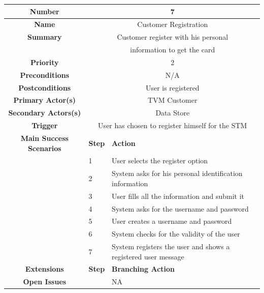 \documentclass[a4paper,12pt]{report}
\begin{document}
\begin{tabular}{ | c | p{2cm} | p{7cm} |}
	
	\hline
	\textbf{Number} & \multicolumn{2}{c|}{7}  \\
	\hline
	\textbf{Name} & \multicolumn{2}{c|}{Customer Registration}  \\
	\hline
	\textbf{Summary} & \multicolumn{2}{c|}{Customer register with his personal}\\
					  & \multicolumn{2}{c|}{information to get the card}  \\
	\hline
	\textbf{Priority} & \multicolumn{2}{c|}{2}  \\
	\hline
	\textbf{Preconditions} & \multicolumn{2}{c|}{N/A}  \\
	\hline
	\textbf{Postconditions} & \multicolumn{2}{c|}{User is registered}  \\
	\hline
	\textbf{Primary Actor(s)} & \multicolumn{2}{c|}{TVM Customer}  \\
	\hline
	\textbf{Secondary Actors(s)} & \multicolumn{2}{c|}{Data Store}  \\
	\hline
	\textbf{Trigger} & \multicolumn{2}{c|}{User has chosen to register himself for the STM} \\
	\hline
	\textbf{Main Success Scenarios} & \textbf{Step} & \textbf{Action} \\
	\hline
	& 1 & User selects the register option \\ 
	\hline
	&  2  & System asks for his personal identification information \\
	\hline
	&  3  & User fills all the information and submit it \\
	\hline
	&  4  & System asks for the username and password \\
	\hline
	&  5  & User creates a username and password \\
	\hline
	&  6  & System checks for the validity of the user \\
	\hline
	&  7  & System registers the user and shows a registered user message \\
	\hline

	\textbf{Extensions} & \textbf{Step} & \textbf{Branching Action} \\
	\hline
	\textbf{Open Issues} &    & NA \\
	\hline

\end{tabular}
\end{document}
